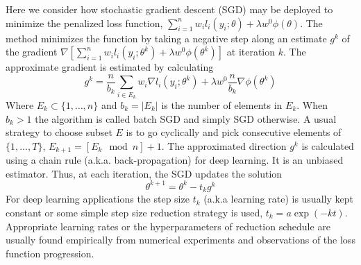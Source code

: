 \documentclass[12pt]{TD-CJS}
\begin{document}
\begin{appendix}\label{SGD}
Here we consider how stochastic gradient descent (SGD) may be deployed to
  minimize the penalized loss function, $\sum_{i=1}^n w_i l_i(y_i; \theta) + \lambda w^{0} \phi(\theta)$. The method minimizes the function by taking a negative step along an estimate $g^k$ of the gradient $\nabla\left[\sum_{i=1}^n w_i l_i(y_i; \theta^k) + \lambda w^{0} \phi(\theta^k)\right] $ at iteration $k$. 
The approximate gradient is estimated by calculating 
\[
g^k = \frac{n}{b_k} \sum_{i \in E_k} w_i\nabla  l_i(y_i; \theta^k) +  \lambda w^{0} \frac{n}{b_k}\nabla \phi(\theta^k)
\]
Where $E_k \subset \{1,\ldots,n \}$ and $b_k = |E_k|$ is the number of elements in $E_k$. When $b_k >1$ the algorithm is called batch SGD and simply SGD otherwise. A usual strategy to choose subset $E$ is to go cyclically and pick consecutive elements of $\{1,\ldots,T \}$, $E_{k+1} = [E_k \mod n]+1$. The approximated direction  $g^k$ is calculated using a chain rule (a.k.a. back-propagation) for deep learning. It  is an unbiased estimator. Thus, at each iteration, the SGD updates the solution
\[
\theta^{k+1} = \theta^k - t_k g^k
\]
For deep learning applications the step size $t_k$ (a.k.a learning rate) is usually kept constant or some simple step size reduction strategy is used, $t_k = a\exp(-kt)$. Appropriate learning rates or the hyperparameters of reduction schedule  are usually found empirically from numerical experiments and observations of the loss function progression. \\
\end{appendix}
\end{document}
